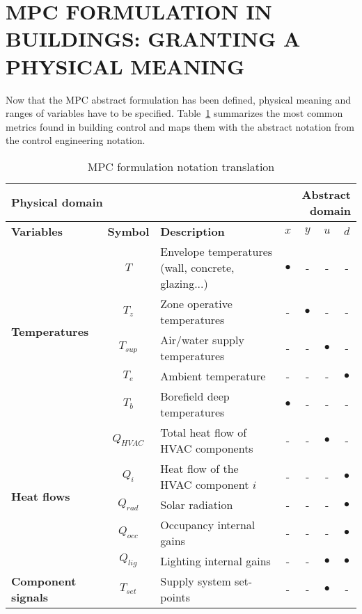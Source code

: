 \documentclass[10pt]{extarticle}
\begin{document}
\section{MPC FORMULATION IN BUILDINGS: GRANTING A PHYSICAL MEANING }

Now that the MPC abstract formulation has been defined, 
physical meaning and ranges of variables have to be specified.
Table~\ref{tab:mpc_form:translation} summarizes the most common
metrics found in building control and maps them with the abstract
notation from the control engineering notation. 


\begin{table}[h]
	\centering
	\caption{MPC formulation notation translation}
	\label{tab:mpc_form:translation}
	\begin{tabular}{l|c|l|cccc}
		\toprule
		\multicolumn{3}{l}{\textbf{Physical domain}} & \multicolumn{4}{r}{\textbf{Abstract domain}} \\
		\toprule
		\textbf{Variables} & \textbf{Symbol} & \textbf{Description} & \textbf{$x$} & \textbf{$y$} & \textbf{$u$} & \textbf{$d$} \\ 
		\midrule
		\multirow{5}{*}{\textbf{Temperatures}} & $T$ & Envelope temperatures (wall, concrete, glazing...) & $\bullet$ & - & - & - \\ 
		& $T_z$ & Zone operative temperatures & - & $\bullet$ & - & - \\
		& $T_{sup}$ & Air/water supply temperatures &  - & - & $\bullet$ & - \\
		& $T_e$ & Ambient temperature &  - & - & - & $\bullet$ \\
		& $T_b$ & Borefield deep temperatures & $\bullet$ & - & - & - \\
		\midrule
		\multirow{5}{*}{\textbf{Heat flows}} &
		$Q_{HVAC}$ & Total heat flow of HVAC components & - & - & $\bullet$ & - \\
		& $Q_{i}$ & Heat flow of the HVAC component $i$ & - & - & - & $\bullet$ \\
		& $Q_{rad}$ & Solar radiation & - & - & - & $\bullet$ \\
		& $Q_{occ}$ & Occupancy internal gains & - & - & - & $\bullet$ \\
		& $Q_{lig}$ & Lighting internal gains & - & - & $\bullet$ & $\bullet$ \\
		\midrule
		\multirow{5}{*}{\textbf{Component signals}} &
		$T_{set}$ & Supply system set-points & - & - & $\bullet$ & - \\

\end{tabular}
\end{table}
\end{document}
